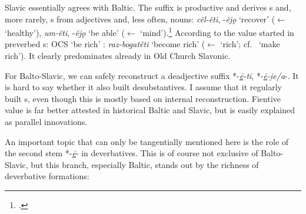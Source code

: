 \documentclass[output=paper,colorlinks,citecolor=brown]{langscibook}
\begin{document}
Slavic essentially agrees with Baltic. The suffix  is productive and derives s and, more rarely, s from adjectives   and, less often, nouns: \textit{cěl-ěti}, -\textit{ějǫ} ‘recover’ ($\leftarrow$  ‘healthy’), \textit{um-ěti}, -\textit{ějǫ} ‘be able’ ($\leftarrow$  ‘mind’).\footnote{\citet[366--373]{Vaillant1966}.} According to \citet[369]{Vaillant1966} the  value started in preverbed s: OCS  ‘be rich’ : \textit{raz-bogatěti} ‘become rich’ ($\leftarrow$  ‘rich’; cf.\   ‘make rich’). It clearly predominates already in Old Church Slavonic.

For Balto-Slavic, we can safely reconstruct a deadjective  suffix *-\textit{\underline{ē}-tī}, *-\textit{\underline{ē}-i̯e/a}-. It is hard to say whether it also built desubstantives. I assume that it regularly built s, even though this is mostly based on internal reconstruction. Fientive value is far better attested in historical Baltic and Slavic, but is easily explained as parallel innovations.

An important topic that can only be tangentially mentioned here is the role of the second stem *-\textit{\underline{ē}}- in deverbatives. This is of course not exclusive of Balto-Slavic, but this branch, especially Baltic, stands out by the richness of deverbative formations:
\end{document}
